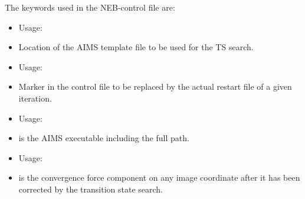 The keywords used in the NEB-control file are:

{\begin{itemize}
  \item Usage:  
  \item Location of the AIMS template file to be used for the TS search.
  \end{itemize}}

{\begin{itemize}
  \item Usage:  
  \item Marker in the control file to be replaced by the actual restart file of a given iteration. 
  \end{itemize}}

{\begin{itemize}
    \item Usage:  
    \item {} is the AIMS executable including the full path.
  \end{itemize}}

{\begin{itemize}
    \item Usage:  
    \item {} is the convergence force component on any image coordinate 
                         after it has been corrected by the transition state search.
  \end{itemize}}

